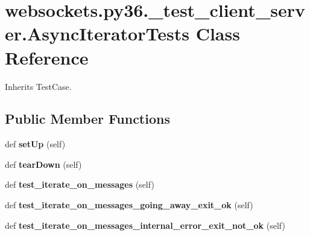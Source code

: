 \hypertarget{classwebsockets_1_1py36_1_1__test__client__server_1_1_async_iterator_tests}{}\section{websockets.\+py36.\+\_\+test\+\_\+client\+\_\+server.\+Async\+Iterator\+Tests Class Reference}
\label{classwebsockets_1_1py36_1_1__test__client__server_1_1_async_iterator_tests}


Inherits Test\+Case.

\subsection*{Public Member Functions}
\begin{DoxyCompactItemize}
\item 
\mbox{\label{classwebsockets_1_1py36_1_1__test__client__server_1_1_async_iterator_tests_a5eceefa6813d6562d830a0d207d544a8}} 
def {\bfseries set\+Up} (self)
\item 
\mbox{\label{classwebsockets_1_1py36_1_1__test__client__server_1_1_async_iterator_tests_a43342e4c36a2b0a69b9e5875fc49b518}} 
def {\bfseries tear\+Down} (self)
\item 
\mbox{\label{classwebsockets_1_1py36_1_1__test__client__server_1_1_async_iterator_tests_a017b19295a9f39744cca97eaba441881}} 
def {\bfseries test\+\_\+iterate\+\_\+on\+\_\+messages} (self)
\item 
\mbox{\label{classwebsockets_1_1py36_1_1__test__client__server_1_1_async_iterator_tests_a67190b87364429da67479bcf8b342469}} 
def {\bfseries test\+\_\+iterate\+\_\+on\+\_\+messages\+\_\+going\+\_\+away\+\_\+exit\+\_\+ok} (self)
\item 
\mbox{\label{classwebsockets_1_1py36_1_1__test__client__server_1_1_async_iterator_tests_afddec0172d459ad077f3058679902ac2}} 
def {\bfseries test\+\_\+iterate\+\_\+on\+\_\+messages\+\_\+internal\+\_\+error\+\_\+exit\+\_\+not\+\_\+ok} (self)
\end{DoxyCompactItemize}
